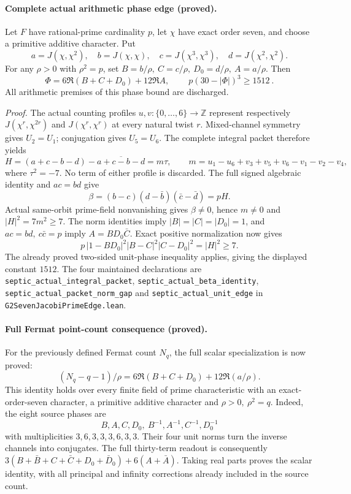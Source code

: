 \documentclass[11pt]{article}
\begin{document}
\paragraph{Complete actual arithmetic phase edge (proved).}
Let \(F\) have rational-prime cardinality \(p\), let \(\chi\) have
exact order seven, and choose a primitive additive character.
Put
\[
 a=J(\chi,\chi^2),\quad b=J(\chi,\chi),\quad
 c=J(\chi^3,\chi^3),\quad d=J(\chi^2,\chi^2).
\]
For any \(\rho>0\) with \(\rho^2=p\), set
\(B=b/\rho,\ C=c/\rho,\ D_0=d/\rho,\ A=a/\rho\). Then
\[
 \Phi=6\Re(B+C+D_0)+12\Re A,\qquad
 \boxed{\ p(30-|\Phi|)^3\ge1512\ }.
\]
All arithmetic premises of this phase bound are discharged.

\emph{Proof.}
The actual counting profiles \(u,v:\{0,\ldots,6\}\to\mathbb Z\)
represent respectively \(J(\chi^r,\chi^{2r})\) and
\(J(\chi^r,\chi^r)\) at every natural twist \(r\).
Mixed-channel symmetry gives \(U_2=U_1\); conjugation gives
\(U_5=U_6\). The complete integral packet therefore yields
\[
 H=(a+c-b-d)-\overline{a+c-b-d}=m\tau,\qquad
 m=u_1-u_6+v_3+v_5+v_6-v_1-v_2-v_4,
\]
where \(\tau^2=-7\). No term of either profile is discarded.
The full signed algebraic identity and \(ac=bd\) give
\[
 \beta=(b-c)(d-\bar b)(\bar c-\bar d)=pH.
\]
Actual same-orbit prime-field nonvanishing gives \(\beta\ne0\),
hence \(m\ne0\) and \(|H|^2=7m^2\ge7\).
The norm identities imply \(|B|=|C|=|D_0|=1\), and
\(ac=bd,\ c\bar c=p\) imply \(A=BD_0\bar C\).
Exact positive normalization now gives
\[
 p\,|1-BD_0|^2|B-C|^2|C-D_0|^2=|H|^2\ge7.
\]
The already proved two-sided unit-phase inequality applies, giving
the displayed constant \(1512\).
The four maintained declarations are
\texttt{septic\_actual\_integral\_packet},
\texttt{septic\_actual\_beta\_identity},
\texttt{septic\_actual\_packet\_norm\_gap} and
\texttt{septic\_actual\_unit\_edge} in
\texttt{G2SevenJacobiPrimeEdge.lean}.

\paragraph{Full Fermat point-count consequence (proved).}
For the previously defined Fermat count \(N_q\), the full scalar
specialization is now proved:
\[
 (N_q-q-1)/\rho=6\Re(B+C+D_0)+12\Re(a/\rho).
\]
This identity holds over every finite field of prime characteristic
with an exact-order-seven character, a primitive additive character
and \(\rho>0,\ \rho^2=q\).
Indeed, the eight source phases are
\[
 B,A,C,D_0,\ B^{-1},A^{-1},C^{-1},D_0^{-1}
\]
with multiplicities \(3,6,3,3,3,6,3,3\).
Their four unit norms turn the inverse channels into conjugates.
The full thirty-term readout is consequently
\(3(B+\bar B+C+\bar C+D_0+\bar D_0)+6(A+\bar A)\).
Taking real parts proves the scalar identity, with all principal
and infinity corrections already included in the source count.
\end{document}
